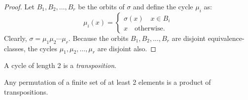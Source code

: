 \begin{proof}
    Let $B_1, B_2, \ldots, B_r$ be the orbits of $\sigma$ and define the cycle $\mu_i$ as: 
    \[
        \mu_i(x) = \begin{cases*}
        \sigma(x) \quad x \in B_i \\
        x \quad \text{otherwise.}
        \end{cases*}
    \]
    Clearly, $\sigma = \mu_1\mu_2\cdots\mu_r$. Because the orbits $B_1, B_2, \ldots, B_r$ are disjoint equivalence-classes, the cycles $\mu_1, \mu_2, \ldots, \mu_r$ are disjoint also.
\end{proof}
\begin{definition}[Transposition]
    A cycle of length 2 is a \emph{transposition}.
\end{definition}
\begin{corollary}
    Any permutation of a finite set of at least 2 elements is a product of transpositions.
\end{corollary}



